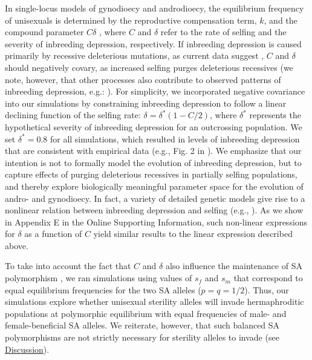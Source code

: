 \documentclass{article}
\begin{document}
In single-locus models of gynodioecy and androdioecy, the equilibrium frequency of unisexuals is determined by the reproductive compensation term, $k$, and the compound parameter $C \delta$ \citep{Charlesworth1978a}, where $C$ and $\delta$ refer to the rate of selfing and the severity of inbreeding depression, respectively. If inbreeding depression is caused primarily by recessive deleterious mutations, as current data suggest \citep{Charlesworth2009}, $C$ and $\delta$ should negatively covary, as increased selfing purges deleterious recessives (we note, however, that other processes also contribute to observed patterns of inbreeding depression, e.g.: \citealt{CrnokrakBarrett2002, Charlesworth-etal-2007, Charlesworth2009, HedrickGarcia-Dorado2016}). For simplicity, we incorporated negative covariance into our simulations by constraining inbreeding depression to follow a linear declining function of the selfing rate: $\delta = \delta^\ast(1 - C/2)$, where $\delta^\ast$ represents the hypothetical severity of inbreeding depression for an outcrossing population. We set $\delta^\ast = 0.8$ for all simulations, which resulted in levels of inbreeding depression that are consistent with empirical data (e.g., Fig. 2 in \citealt{HusbandSchemske1996}). We emphasize that our intention is not to formally model the evolution of inbreeding depression, but to capture effects of purging deleterious recessives in partially selfing populations, and thereby explore biologically meaningful parameter space for the evolution of andro- and gynodioecy. In fact, a variety of detailed genetic models give rise to a nonlinear relation between inbreeding depression and selfing (e.g., \citealt{OhtaCockerham1974, LandeSchemske1985, Charlesworth1985, Roze2015, Garcia-Dorado2017, LandePorcher2017}). As we show in Appendix E in the Online Supporting Information, such non-linear expressions for $\delta$ as a function of $C$ yield similar results to the linear expression described above. 

To take into account the fact that $C$ and $\delta$ also influence the maintenance of SA polymorphism \citep{JordanConnallon2014,Olito2017}, we ran simulations using values of $s_f$ and $s_m$ that correspond to equal equilibrium frequencies for the two SA alleles ($p = q = 1/2$). Thus, our simulations explore whether unisexual sterility alleles will invade hermaphroditic populations at polymorphic equilibrium with equal frequencies of male- and female-beneficial SA alleles. We reiterate, however, that such balanced SA polymorphisms are not strictly necessary for sterility alleles to invade (see \hyperref[sec:Discussion]{Discussion}).
\end{document}
